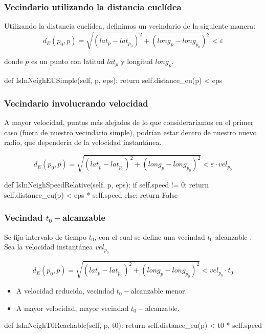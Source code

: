 \documentclass[10pt, spanish]{beamer}
\begin{document}
\begin{frame}[fragile]
\frametitle{Vecindario utilizando la distancia eucl\'idea}

Utilizando la distancia eucl\'idea, definimos un vecindario de la siguiente manera:\\

$$ d_E(p_0, p) = \sqrt{(lat_{p} - lat_{p_0})^2 + (long_{p} - long_{p_0})^2 } < \varepsilon $$

donde $p$ es un punto con latitud $lat_{p}$ y longitud $long_{p}$.\\

\bigskip
\begin{python}
    def IsInNeighEUSimple(self, p, eps):
        return self.distance_eu(p) < eps
\end{python}

\end{frame}


\begin{frame}[fragile]
\frametitle{Vecindario involucrando velocidad}

A mayor velocidad, puntos m\'as alejados de lo que considerar\'iamos en el primer caso (fuera de nuestro vecindario simple), podr\'ian estar dentro de nuestro nuevo radio, que depender\'ia de la velocidad instant\'anea.

$$ d_E(p_0, p) = \sqrt{(lat_{p} - lat_{p_0})^2 + (long_{p} - long_{p_0})^2 } < \varepsilon \cdot vel_{p_0} $$

\bigskip
\begin{python}
    def IsInNeighSpeedRelative(self, p, eps):
        if self.speed != 0:
            return self.distance_eu(p) < eps * self.speed	
        else:
            return False
\end{python}

\end{frame}
\begin{frame}[fragile]
\frametitle{Vecindad $t_0-$alcanzable}

Se fija intervalo de tiempo $t_0$, con el cual se define una vecindad $t_0$-alcanzable .\\
\bigskip
Sea la velocidad instant\'anea $vel_{p_0}$

$$ d_E(p_0, p) = \sqrt{(lat_{p} - lat_{p_0})^2 + (long_{p} - long_{p_0})^2 } < vel_{p_0} \cdot t_0 $$

\begin{itemize}
 \item A velocidad reducida, vecindad $t_0-$alcanzable menor.
 \item A mayor velocidad, mayor vecindad $t_0-$alcanzable.
\end{itemize}

\bigskip
\begin{python}
    def IsInNeighT0Reachable(self, p, t0):
        return self.distance_eu(p) < t0 * self.speed
\end{python}

\end{frame}
\end{document}
